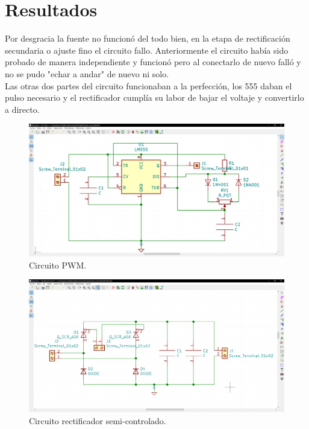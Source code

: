 \documentclass[letterpaper]{article}
\begin{document}
\section{Resultados}
\begin{large}
    Por desgracia la fuente no funcionó del todo bien, en la etapa de rectificación secundaria o ajuste fino el circuito fallo. Anteriormente el circuito había sido probado de manera independiente y funcionó pero al conectarlo de nuevo falló y no se pudo "echar a andar" de nuevo ni solo.\\
    Las otras dos partes  del circuito funcionaban a la perfección, los 555 daban el pulso necesario y el rectificador cumplía su labor de bajar el voltaje y convertirlo a directo.
\end{large}


\begin{figure}[htbp]
    \centering
    \includegraphics[scale=0.2]{IMG/555.png}
    \caption{Circuito PWM.}
    \label{fig:PWM}
\end{figure}

\begin{figure}[htbp]
    \centering
    \includegraphics[scale=0.2]{IMG/rectificador.png}
    \caption{Circuito rectificador semi-controlado.}
    \label{fig:SCR}
\end{figure}
\end{document}

